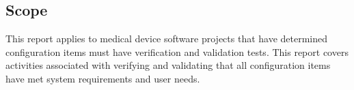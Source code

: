 \subsection{Scope}
This report applies to \stdCompanyName{} medical device software projects that
have determined configuration items must have verification and validation tests.
This report covers activities associated with verifying and validating that all
configuration items have met system requirements and user needs.
